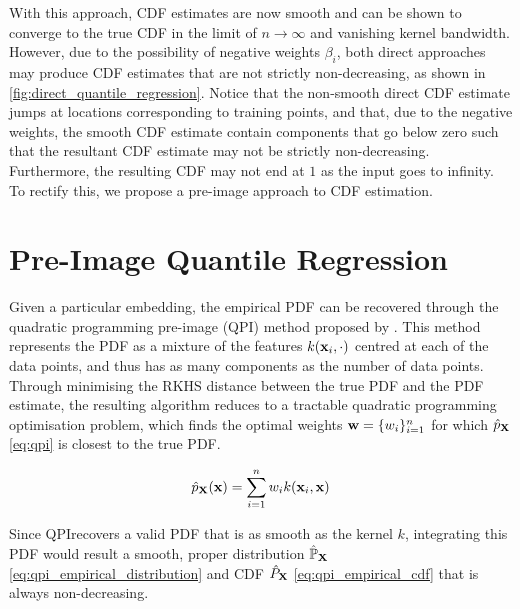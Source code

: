\documentclass[twoside]{article} \usepackage{aistats2017}
\theoremstyle{definition}
\theoremstyle{theorem}
\newcommand{\rv}[1]{{#1}}
\newcommand{\warn}[1]{{\color{red} #1}}
\newcommand{\qpi}{QPI}
\begin{document}
		With this approach, CDF estimates are now smooth and can be shown to converge to the true CDF in the limit of $n \rightarrow \infty$ and vanishing kernel bandwidth. However, due to the possibility of negative weights $\beta_{i}$, both direct approaches may produce CDF estimates that are not strictly non-decreasing, as shown in \cref{fig:direct_quantile_regression}. Notice that the non-smooth direct CDF estimate jumps at locations corresponding to training points, and that, due to the negative weights, the smooth CDF estimate contain components that go below zero such that the resultant CDF estimate may not be strictly non-decreasing. Furthermore, the resulting CDF may not end at $1$ as the input goes to infinity. To rectify this, we propose a pre-image approach to CDF estimation.

\section{Pre-Image Quantile Regression}
\label{sec:pre_image_quantile_regression}

	
	Given a particular embedding, the empirical PDF can be recovered through the quadratic programming pre-image (\qpi) method proposed by \cite{mccalman2013multi}. This method represents the PDF as a mixture of the features $k(\mathbf{x}_{i}, \cdot)$ centred at each of the data points, and thus has as many components as the number of data points. Through minimising the RKHS distance between the true PDF and the PDF estimate, the resulting algorithm reduces to a tractable quadratic programming optimisation problem, which finds the optimal weights $\mathbf{w} = \{w_{i}\}_{i = 1}^{n}$ for which $\hat{p}_{\bvec{\rv{X}}}$ \eqref{eq:qpi} is closest to the true PDF. 
	
	\begin{equation}
		\hat{p}_{\bvec{\rv{X}}}(\bvec{x}) = \sum_{i = 1}^{n} w_{i} k(\bvec{x}_{i}, \bvec{x})
	\label{eq:qpi}
	\end{equation}

	Since \qpi\space recovers a valid PDF that is as smooth as the kernel $k$, integrating this PDF would result a smooth, proper distribution $\hat{\mathbb{P}}_{\bvec{\rv{X}}}$ \eqref{eq:qpi_empirical_distribution} and CDF $\hat{P}_{\bvec{\rv{X}}}$ \eqref{eq:qpi_empirical_cdf} that is always non-decreasing.
	
\end{document}

